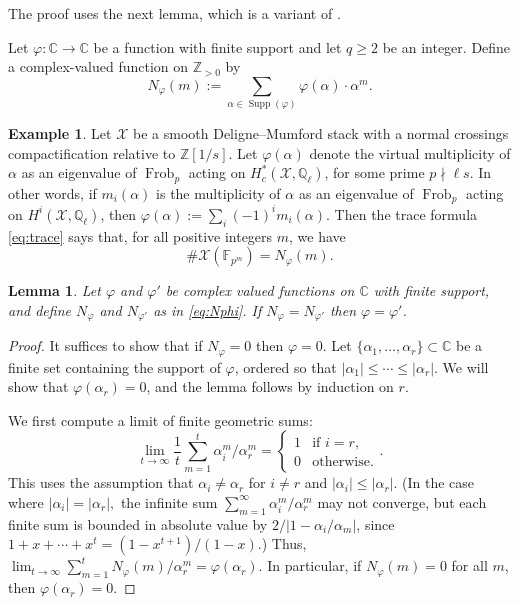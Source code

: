 \documentclass[12pt]{amsart}
\newtheorem{lem}[thm]{Lemma}
\theoremstyle{definition}
\newtheorem{example}[thm]{Example}
\numberwithin{equation}{section}
\newcommand{\Z}{\mathbb{Z}}
\newcommand{\F}{\mathbb{F}}
\newcommand{\cc}{\mathbb{C}}
\DeclareMathOperator{\Supp}{Supp}
\DeclareMathOperator{\Frob}{Frob}
\newcommand{\ZZ}{\mathbb{Z}}
\newcommand{\CC}{\mathbb{C}}
\newcommand{\QQ}{\mathbb{Q}}
\newcommand{\cX}{\mathcal{X}}
\theoremstyle{definition} %
\theoremstyle{remark}
\begin{document}
The proof uses the next lemma, which is a variant of \cite[Lemma~4.1]{BogaartEdixhoven}. 

\medskip

Let $\varphi \colon \CC \to \CC$ be a function with finite support and let $q \geq 2$ be an integer.  Define a complex-valued function on $\ZZ_{>0}$ by
\begin{equation} \label{eq:Nphi}
N_\varphi(m) := \sum_{\alpha \in \Supp(\varphi)} \varphi(\alpha) \cdot \alpha^m.
\end{equation}

\begin{example} \label{ex:Nphi}
Let $\cX$ be a smooth Deligne--Mumford stack with a normal crossings compactification relative to $\Z[1/s]$.  Let $\varphi(\alpha)$ denote the virtual multiplicity of $\alpha$ as an eigenvalue of $\Frob_p$ acting on $H^*_c(\cX,\QQ_\ell)$, for some prime $p \nmid \ell s$. In other words, if $m_i(\alpha)$ is the multiplicity of $\alpha$ as an eigenvalue of $\Frob_p$ acting on $H^i(\cX, \QQ_\ell)$, then $\varphi(\alpha) := \sum_i (-1)^i m_i(\alpha).$ Then the trace formula \eqref{eq:trace} says that, for all positive integers $m$, we have
\[
\#\cX(\F_{p^m}) = N_\varphi(m).
\]
\end{example}

\begin{lem} \label{lem:Nphi}
Let $\varphi$ and $\varphi'$ be complex valued functions on $\CC$ with finite support, and define $N_\varphi$ and $N_{\varphi'}$ as in \eqref{eq:Nphi}. If $N_\varphi = N_{\varphi'}$ then $\varphi = \varphi'$.
\end{lem}

\begin{proof}
It suffices to show that if $N_\varphi = 0$ then $\varphi = 0$. Let $\{\alpha_1, \ldots, \alpha_r\}\subset \cc$ be a finite set containing the support of $\varphi$, ordered so that $|\alpha_1| \leq \cdots \leq |\alpha_r|$. We will show that $\varphi(\alpha_r) = 0$, and the lemma follows by induction on $r$. 

We first compute a limit of finite geometric sums:
\[
\lim_{t\to \infty} \frac 1 t \sum_{m=1}^t \alpha_i^m / \alpha_r^m
=
\begin{cases}
1 & \text{if $i=r$}, \\
0 & \text{otherwise}.
\end{cases}.
\]
This uses the assumption that $\alpha_i \neq \alpha_r$ for $i \neq r$ and $|\alpha_i| \leq |\alpha_r|$.  (In the case where $|\alpha_i| = |\alpha_r|,$ the infinite sum $\sum_{m = 1}^\infty \alpha_i^m / \alpha_r^m$ may not converge, but each finite sum is bounded in absolute value by $2/ |1 - \alpha_i/\alpha_m|$, since $1 + x + \cdots + x^t = (1-x^{t+1})/ (1 -x)$.)  Thus, $\lim_{t \to \infty} \sum_{m = 1}^t N_\varphi(m)/\alpha_r^{m}  = \varphi(\alpha_r)$.  In particular, if $N_\varphi(m) = 0$ for all $m$, then $\varphi(\alpha_r) = 0$. 
\end{proof}
\end{document}
